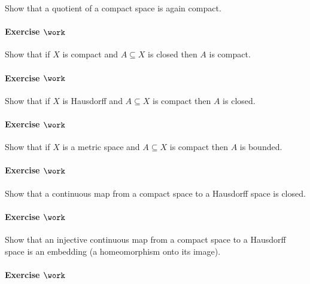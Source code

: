 Show that a quotient of a compact space is again compact.

\hypertarget{exercise-work-19}{%
\paragraph{\texorpdfstring{Exercise
\(\work\)}{Exercise \textbackslash work}}\label{exercise-work-19}}

Show that if \(X\) is compact and \(A\subseteq X\) is closed then \(A\)
is compact.

\hypertarget{exercise-work-20}{%
\paragraph{\texorpdfstring{Exercise
\(\work\)}{Exercise \textbackslash work}}\label{exercise-work-20}}

Show that if \(X\) is Hausdorff and \(A\subseteq X\) is compact then
\(A\) is closed.

\hypertarget{exercise-work-21}{%
\paragraph{\texorpdfstring{Exercise
\(\work\)}{Exercise \textbackslash work}}\label{exercise-work-21}}

Show that if \(X\) is a metric space and \(A\subseteq X\) is compact
then \(A\) is bounded.

\hypertarget{exercise-work-22}{%
\paragraph{\texorpdfstring{Exercise
\(\work\)}{Exercise \textbackslash work}}\label{exercise-work-22}}

Show that a continuous map from a compact space to a Hausdorff space is
closed.

\hypertarget{exercise-work-23}{%
\paragraph{\texorpdfstring{Exercise
\(\work\)}{Exercise \textbackslash work}}\label{exercise-work-23}}

Show that an injective continuous map from a compact space to a
Hausdorff space is an embedding (a homeomorphism onto its image).

\hypertarget{exercise-work-24}{%
\paragraph{\texorpdfstring{Exercise
\(\work\)}{Exercise \textbackslash work}}\label{exercise-work-24}}

